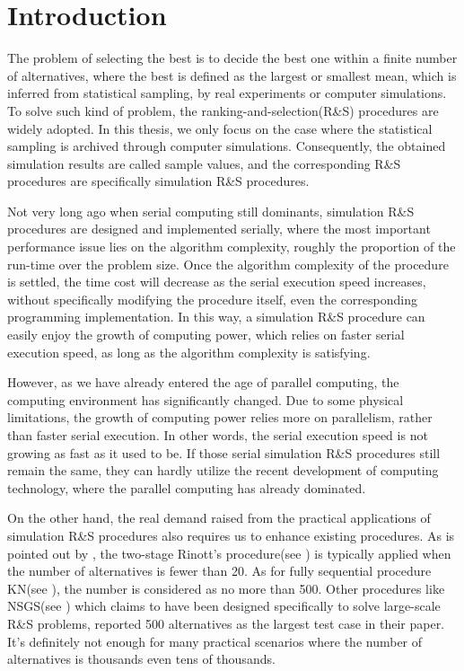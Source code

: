 \chapter{Introduction}

The problem of selecting the best is to decide the best one within a finite number of alternatives, where the best is defined as the largest or smallest mean, which is inferred from statistical sampling, by real experiments or computer simulations. To solve such kind of problem, the ranking-and-selection(R\&S) procedures are widely adopted. In this thesis, we only focus on the case where the statistical sampling is archived through computer simulations. Consequently, the obtained simulation results are called sample values, and the corresponding R\&S procedures are specifically simulation R\&S procedures.

Not very long ago when serial computing still dominants, simulation R\&S procedures are designed and implemented serially, where the most important performance issue lies on the algorithm complexity, roughly the proportion of the run-time over the problem size. Once the algorithm complexity of the procedure is settled, the time cost will decrease as the serial execution speed increases, without specifically modifying the procedure itself, even the corresponding programming implementation. In this way, a simulation R\&S procedure can easily enjoy the growth of computing power, which relies on faster serial execution speed, as long as the algorithm complexity is satisfying.

However, as we have already entered the age of parallel computing, the computing environment has significantly changed. Due to some physical limitations, the growth of computing power relies more on parallelism, rather than faster serial execution. In other words, the serial execution speed is not growing as fast as it used to be. If those serial simulation R\&S procedures still remain the same, they can hardly utilize the recent development of computing technology, where the parallel computing has already dominated.

On the other hand, the real demand raised from the practical applications of simulation R\&S procedures also requires us to enhance existing procedures. As is pointed out by \cite{ehiorams06ras}, the two-stage Rinott's procedure(see \cite{cistam1978rinott}) is typically applied when the number of alternatives is fewer than 20. As for fully sequential procedure KN(see \cite{tomacs01kn}), the number is considered as no more than 500. Other procedures like NSGS(see \cite{or01nsgs}) which claims to have been designed specifically to solve large-scale R\&S problems, reported 500 alternatives as the largest test case in their paper. It's definitely not enough for many practical scenarios where the number of alternatives is thousands even tens of thousands.

